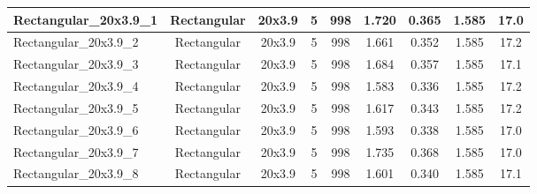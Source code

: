\begin{table}
\begin{adjustbox}{max width = \linewidth}
\begin{tabular}{lcccccccc}
\multicolumn{1}{|l|}{Rectangular\_20x3.9\_1} & \multicolumn{1}{c|}{Rectangular} & \multicolumn{1}{c|}{20x3.9} & \multicolumn{1}{c|}{5} & \multicolumn{1}{c|}{998} & \multicolumn{1}{c|}{1.720} & \multicolumn{1}{c|}{0.365} & \multicolumn{1}{c|}{1.585} & \multicolumn{1}{c|}{17.0} \\ \hline
\multicolumn{1}{|l|}{Rectangular\_20x3.9\_2} & \multicolumn{1}{c|}{Rectangular} & \multicolumn{1}{c|}{20x3.9} & \multicolumn{1}{c|}{5} & \multicolumn{1}{c|}{998} & \multicolumn{1}{c|}{1.661} & \multicolumn{1}{c|}{0.352} & \multicolumn{1}{c|}{1.585} & \multicolumn{1}{c|}{17.2} \\ \hline
\multicolumn{1}{|l|}{Rectangular\_20x3.9\_3} & \multicolumn{1}{c|}{Rectangular} & \multicolumn{1}{c|}{20x3.9} & \multicolumn{1}{c|}{5} & \multicolumn{1}{c|}{998} & \multicolumn{1}{c|}{1.684} & \multicolumn{1}{c|}{0.357} & \multicolumn{1}{c|}{1.585} & \multicolumn{1}{c|}{17.1} \\ \hline
\multicolumn{1}{|l|}{Rectangular\_20x3.9\_4} & \multicolumn{1}{c|}{Rectangular} & \multicolumn{1}{c|}{20x3.9} & \multicolumn{1}{c|}{5} & \multicolumn{1}{c|}{998} & \multicolumn{1}{c|}{1.583} & \multicolumn{1}{c|}{0.336} & \multicolumn{1}{c|}{1.585} & \multicolumn{1}{c|}{17.2} \\ \hline
\multicolumn{1}{|l|}{Rectangular\_20x3.9\_5} & \multicolumn{1}{c|}{Rectangular} & \multicolumn{1}{c|}{20x3.9} & \multicolumn{1}{c|}{5} & \multicolumn{1}{c|}{998} & \multicolumn{1}{c|}{1.617} & \multicolumn{1}{c|}{0.343} & \multicolumn{1}{c|}{1.585} & \multicolumn{1}{c|}{17.2} \\ \hline
\multicolumn{1}{|l|}{Rectangular\_20x3.9\_6} & \multicolumn{1}{c|}{Rectangular} & \multicolumn{1}{c|}{20x3.9} & \multicolumn{1}{c|}{5} & \multicolumn{1}{c|}{998} & \multicolumn{1}{c|}{1.593} & \multicolumn{1}{c|}{0.338} & \multicolumn{1}{c|}{1.585} & \multicolumn{1}{c|}{17.0} \\ \hline
\multicolumn{1}{|l|}{Rectangular\_20x3.9\_7} & \multicolumn{1}{c|}{Rectangular} & \multicolumn{1}{c|}{20x3.9} & \multicolumn{1}{c|}{5} & \multicolumn{1}{c|}{998} & \multicolumn{1}{c|}{1.735} & \multicolumn{1}{c|}{0.368} & \multicolumn{1}{c|}{1.585} & \multicolumn{1}{c|}{17.0} \\ \hline
\multicolumn{1}{|l|}{Rectangular\_20x3.9\_8} & \multicolumn{1}{c|}{Rectangular} & \multicolumn{1}{c|}{20x3.9} & \multicolumn{1}{c|}{5} & \multicolumn{1}{c|}{998} & \multicolumn{1}{c|}{1.601} & \multicolumn{1}{c|}{0.340} & \multicolumn{1}{c|}{1.585} & \multicolumn{1}{c|}{17.1} \\ \hline

\end{tabular}
\end{adjustbox}
\end{table}
